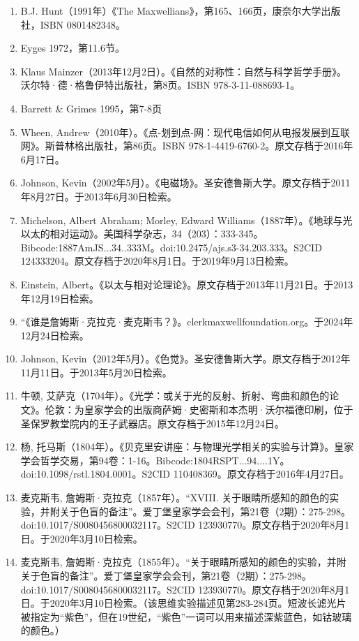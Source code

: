 \begin{enumerate}
\item B.J. Hunt（1991年）《The Maxwellians》，第165、166页，康奈尔大学出版社，ISBN 0801482348。  
\item Eyges 1972，第11.6节。
\item Klaus Mainzer（2013年12月2日）。《自然的对称性：自然与科学哲学手册》。沃尔特·德·格鲁伊特出版社，第8页。ISBN 978-3-11-088693-1。  
\item Barrett & Grimes 1995，第7-8页  
\item Wheen, Andrew（2010年）。《点-划到点-网：现代电信如何从电报发展到互联网》。斯普林格出版社，第86页。ISBN 978-1-4419-6760-2。原文存档于2016年6月17日。  
\item Johnson, Kevin（2002年5月）。《电磁场》。圣安德鲁斯大学。原文存档于2011年8月27日。于2013年6月30日检索。  
\item Michelson, Albert Abraham; Morley, Edward Williams（1887年）。《地球与光以太的相对运动》。美国科学杂志，34（203）：333-345。Bibcode:1887AmJS...34..333M。doi:10.2475/ajs.s3-34.203.333。S2CID 124333204。原文存档于2020年8月1日。于2019年9月13日检索。  
\item Einstein, Albert。《以太与相对论理论》。原文存档于2013年11月21日。于2013年12月19日检索。
\item “《谁是詹姆斯·克拉克·麦克斯韦？》。clerkmaxwellfoundation.org。于2024年12月24日检索。  
\item Johnson, Kevin（2012年5月）。《色觉》。圣安德鲁斯大学。原文存档于2012年11月11日。于2013年5月20日检索。  
\item 牛顿, 艾萨克（1704年）。《光学：或关于光的反射、折射、弯曲和颜色的论文》。伦敦：为皇家学会的出版商萨姆·史密斯和本杰明·沃尔福德印刷，位于圣保罗教堂院内的王子武器店。原文存档于2015年12月24日。  
\item 杨, 托马斯（1804年）。《贝克里安讲座：与物理光学相关的实验与计算》。皇家学会哲学交易，第94卷：1-16。Bibcode:1804RSPT...94....1Y。doi:10.1098/rstl.1804.0001。S2CID 110408369。原文存档于2016年4月27日。  
\item 麦克斯韦, 詹姆斯·克拉克（1857年）。“XVIII. 关于眼睛所感知的颜色的实验，并附关于色盲的备注”。爱丁堡皇家学会会刊，第21卷（2期）：275-298。doi:10.1017/S0080456800032117。S2CID 123930770。原文存档于2020年8月1日。于2020年3月10日检索。  
\item 麦克斯韦, 詹姆斯·克拉克（1855年）。“关于眼睛所感知的颜色的实验，并附关于色盲的备注”。爱丁堡皇家学会会刊，第21卷（2期）：275-298。doi:10.1017/S0080456800032117。S2CID 123930770。原文存档于2020年8月1日。于2020年3月10日检索。（该思维实验描述见第283-284页。短波长滤光片被指定为“紫色”，但在19世纪，“紫色”一词可以用来描述深紫蓝色，如钴玻璃的颜色。）


\end{enumerate}
